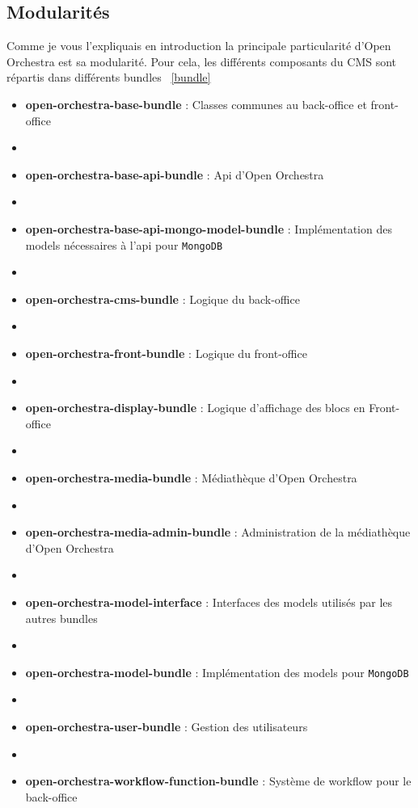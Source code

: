    \subsection{Modularités}
   Comme je vous l'expliquais en introduction la principale particularité d'Open Orchestra est sa modularité. Pour cela, les différents composants du CMS sont répartis dans différents bundles ~\ref{bundle}
   \begin{itemize}
   \item \textbf{open-orchestra-base-bundle} : Classes communes au back-office et front-office
            \item[]
   \item \textbf{open-orchestra-base-api-bundle} : Api d'Open Orchestra
         \item[]   
   \item \textbf{open-orchestra-base-api-mongo-model-bundle} : Implémentation des models nécessaires à l'api pour \verb?MongoDB? 
            \item[]
   \item \textbf{open-orchestra-cms-bundle} : Logique du back-office
            \item[]
   \item \textbf{open-orchestra-front-bundle} : Logique du front-office
            \item[]
   \item \textbf{open-orchestra-display-bundle} : Logique d'affichage des blocs en Front-office
            \item[]
   \item \textbf{open-orchestra-media-bundle} : Médiathèque d'Open Orchestra
            \item[]
   \item \textbf{open-orchestra-media-admin-bundle} : Administration de la médiathèque d'Open Orchestra
            \item[]
   \item \textbf{open-orchestra-model-interface} : Interfaces des models utilisés par les autres bundles 
            \item[]
   \item \textbf{open-orchestra-model-bundle} : Implémentation des models pour \verb?MongoDB? 
            \item[]
   \item \textbf{open-orchestra-user-bundle} : Gestion des utilisateurs 
            \item[]
   \item \textbf{open-orchestra-workflow-function-bundle} : Système de workflow pour le back-office 
   \end{itemize}
